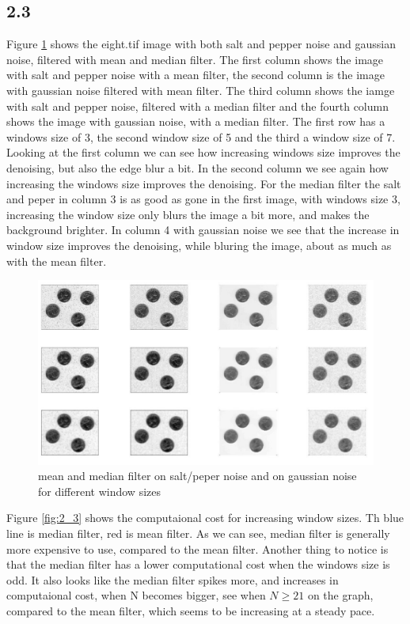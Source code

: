 \documentclass[11pt]{report}
\begin{document}
\subsection{2.3}
Figure \ref{fig:2_3_0} shows the eight.tif image with both salt and pepper noise and gaussian noise, filtered with mean and median filter. The first column shows the image with salt and pepper noise with a mean filter, the second column is the image with gaussian noise filtered with mean filter. The third column shows the iamge with salt and pepper noise, filtered with a median filter and the fourth column shows the image with gaussian noise, with a median filter. The first row has a windows size of 3, the second window size of 5 and the third a window size of 7. Looking at the first column we can see how increasing windows size improves the denoising, but also the edge blur a bit. In the second column we see again how increasing the windows size improves the denoising. For the median filter the salt and peper in column 3 is as good as gone in the first image, with windows size 3, increasing the window size only blurs the image a bit more, and makes the background brighter. In column 4 with gaussian noise we see that the increase in window size improves the denoising, while bluring the image, about as much as with the mean filter.

\begin{figure}[!ht]
    \centering
    \includegraphics[width=1\textwidth]{fig23_0.jpg}
    \caption{mean and median filter on salt/peper noise and on gaussian noise for different window sizes}
    \label{fig:2_3_0}
\end{figure}

Figure \ref{fig:2_3} shows the computaional cost for increasing window sizes. Th blue line is median filter, red is mean filter. As we can see, median filter is generally more expensive to use, compared to the mean filter. Another thing to notice is that the median filter has a lower computational cost when the windows size is odd. It also looks like the median filter spikes more, and increases in computaional cost, when N becomes bigger, see when $N \geq 21$ on the graph, compared to the mean filter, which seems to be increasing at a steady pace.
\end{document}
